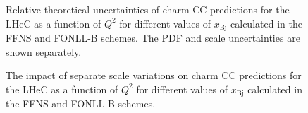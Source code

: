 \documentclass[pdftex,twocolumn,epjc3]{svjour3}          %
\newcommand{\xbj}{\ensuremath{x_{\text{Bj}}}\xspace}
\newcommand{\fonll} {{FONLL-B}\xspace}
\newcommand{\ffns} {{FFNS}\xspace}
\begin{document}
\begin{figure}
    \centering
    \caption{Relative theoretical uncertainties of charm CC predictions for the LHeC as a function of $Q^2$ for different values of \xbj calculated in the \ffns and \fonll schemes. The PDF and scale uncertainties are shown separately.}
    \label{fig:thpred-q2-unc}
\end{figure}

\begin{figure}
    \centering
    \caption{The impact of separate scale variations on charm CC predictions for the LHeC as a function of $Q^2$ for different values of \xbj calculated in the \ffns and \fonll schemes.}
    \label{fig:thpred-q2-varmu}
\end{figure}
\end{document}

